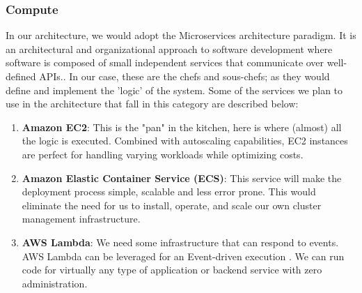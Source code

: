 \documentclass{article}
\begin{document}
\subsubsection{Compute}
In our architecture, we would adopt the Microservices architecture paradigm. It is an architectural and organizational approach to software development where software is composed of small independent services that communicate over well-defined APIs.\cite{microservices}. In our case, these are the chefs and sous-chefs; as they would define and implement the 'logic' of the system. Some of the services we plan to use in the architecture that fall in this category are described below:

\begin{enumerate}
    \item \textbf{Amazon EC2}: This is the "pan" in the kitchen, here is where (almost) all the logic is executed. Combined with autoscaling capabilities, EC2 \cite{ec2} instances are perfect for handling varying workloads while optimizing costs. 
    \item \textbf{Amazon Elastic Container Service (ECS)}: This service will make the deployment process simple, scalable and less error prone.  This would eliminate the need for us to install, operate, and scale our own cluster management infrastructure.
    \item \textbf{AWS Lambda}: We need some infrastructure that can respond to events. AWS Lambda can be leveraged for an Event-driven execution \cite{lambda_events}. We can run code for virtually any type of application or backend service with zero administration. 
\end{enumerate}
\end{document}
